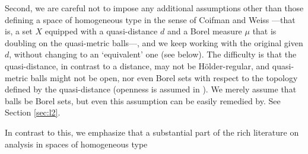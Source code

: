 \documentclass{amsart}
\numberwithin{equation}{section}
\theoremstyle{plain}
\theoremstyle{definition}
\theoremstyle{remark}
\begin{document}
Second, we are careful not to impose any additional assumptions other than those defining a space of homogeneous type in the sense of Coifman and Weiss \cite{CW}---that is, a set $X$ equipped with a quasi-distance $d$ and a  Borel measure $\mu$ that is doubling on the quasi-metric balls---, and we keep working with the original given $d$, without changing to an `equivalent' one (see below).  The difficulty is that  the quasi-distance, in contrast to a distance,  may not be H\"older-regular, and quasi-metric balls might not be open, nor even Borel sets with respect to the topology defined by the quasi-distance (openness is assumed in \cite{CW}).  We merely assume that  balls be Borel sets,  but  even this assumption can be easily remedied by. See  Section \ref{sec:l2}.

In contrast to this, we emphasize that a substantial part of the rich literature on analysis in 
spaces of homogeneous type
\end{document}
